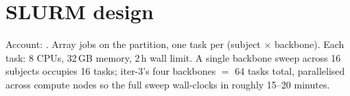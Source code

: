 \section{SLURM design}

Account: . Array jobs on the  partition, one task
per (subject $\times$ backbone). Each task: 8 CPUs, 32\,GB memory, 2\,h wall
limit. A single backbone sweep across 16 subjects occupies 16 tasks;
iter-3's four backbones $=$ 64 tasks total, parallelised across compute
nodes so the full sweep wall-clocks in roughly 15--20 minutes.
